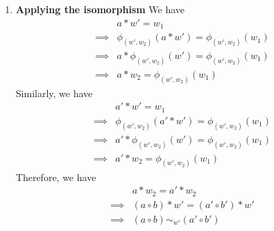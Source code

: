 \begin{proofE}
\begin{enumerate}[(1)]
    \item \textbf{Applying the isomorphism}
    We have
    \begin{align}
        & a \ast w' = w_{1} \\
        \implies & \phi_{(w', w_{2})}(a \ast w') = \phi_{(w', w_{2})}(w_{1}) \\
        \implies & a \ast \phi_{(w', w_{2})}(w') = \phi_{(w', w_{2})}(w_{1}) \\
        \implies & a \ast w_{2} = \phi_{(w', w_{2})}(w_{1})
    \end{align}
    Similarly, we have
    \begin{align}
        & a' \ast w' = w_{1} \\
        \implies & \phi_{(w', w_{2})}(a' \ast w') = \phi_{(w', w_{2})}(w_{1}) \\
        \implies & a' \ast \phi_{(w', w_{2})}(w') = \phi_{(w', w_{2})}(w_{1}) \\
        \implies & a' \ast w_{2} = \phi_{(w', w_{2})}(w_{1})
    \end{align}
    Therefore, we have
    \begin{align}
        & a \ast w_{2} = a' \ast w_{2} \\
        \implies & (a \circ b) \ast w' = (a' \circ b') \ast w' \\
        \implies & (a \circ b) \sim_{w'} (a' \circ b')
    \end{align}
\end{enumerate}
\end{proofE}


